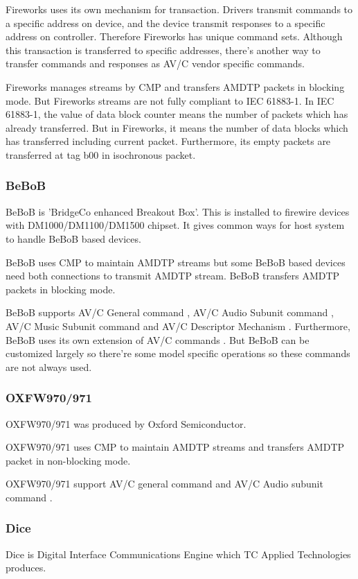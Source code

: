 \documentclass[onecolumn]{article}
\begin{document}
Fireworks uses its own mechanism for transaction. Drivers transmit commands to a specific address on device, and the device transmit responses to a specific address on controller. Therefore Fireworks has unique command sets. Although this transaction is transferred to specific addresses, there's another way to transfer commands and responses as AV/C vendor specific commands.

Fireworks manages streams by CMP and transfers AMDTP packets in blocking mode. But Fireworks streams are not fully compliant to IEC 61883-1. In IEC 61883-1, the value of data block counter means the number of packets which has already transferred. But in Fireworks, it means the number of data blocks which has transferred including current packet. Furthermore, its empty packets are transferred at tag b00 in isochronous packet.


\subsubsection{BeBoB}
BeBoB is 'BridgeCo enhanced Breakout Box'. This is installed to firewire devices with DM1000/DM1100/DM1500 chipset. It gives common ways for host system to handle BeBoB based devices.

BeBoB uses CMP to maintain AMDTP streams but some BeBoB based devices need both connections to transmit AMDTP stream. BeBoB transfers AMDTP packets in blocking mode.

BeBoB supports AV/C General command \cite{avc-general-4-2}, AV/C Audio Subunit command \cite{avc-audio-1}, AV/C Music Subunit command \cite{avc-music-1} and AV/C Descriptor Mechanism \cite{avc-general-enhancement}. Furthermore, BeBoB uses its own extension of AV/C commands \cite{bebob-1, bebob-2}. But BeBoB can be customized largely so there're some model specific operations so these commands are not always used.


\subsubsection{OXFW970/971}
OXFW970/971 was produced by Oxford Semiconductor.

OXFW970/971 uses CMP to maintain AMDTP streams and transfers AMDTP packet in non-blocking mode.

OXFW970/971 support AV/C general command \cite{avc-general-4-2} and AV/C Audio subunit command \cite{avc-audio-1}.

\subsubsection{Dice}
Dice is Digital Interface Communications Engine which TC Applied Technologies produces.
\end{document}

